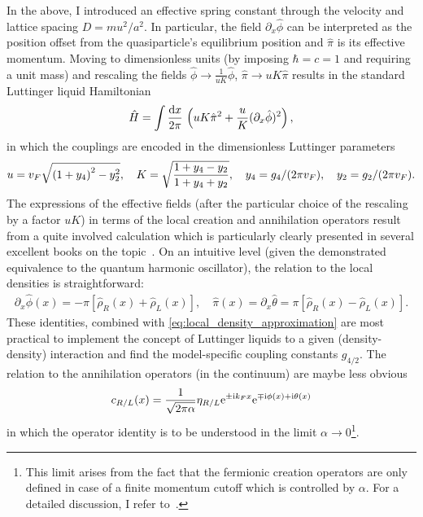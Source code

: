 In the above, I introduced an effective spring constant through the velocity and lattice spacing $D=mu^2/a^2$.
In particular, the field $\partial_x\hat\phi$ can be interpreted as the position offset from the quasiparticle's equilibrium position and $\hat\pi$ is its effective momentum.
Moving to dimensionless units (by imposing $\hbar=c=1$ and requiring a unit mass) and rescaling the fields $\hat\phi\rightarrow \frac1{uK}\hat\phi$, $\hat\pi\rightarrow uK\hat\pi$ results in the standard Luttinger liquid Hamiltonian
\begin{align}
    \hat H = \int\frac{\mathrm d x}{2\pi}\, \left( uK\hat\pi^2 + \frac uK(\partial_x\hat\phi)^2 \right),
    \label{eq:ll_hamiltonian}
\end{align}
in which the couplings are encoded in the dimensionless Luttinger parameters
\begin{align}
    u = v_F\sqrt{\left( 1 + y_4 \right)^2 - y_2^2},
    \quad
    K = \sqrt{\frac{1+y_4-y_2}{1+y_4+y_2}},
    \quad
    y_4=g_4/(2\pi v_F),
    \quad
    y_2=g_2/(2\pi v_F).
\end{align}
The expressions of the effective fields (after the particular choice of the rescaling by a factor $uK$) in terms of the local creation and annihilation operators result from a quite involved calculation which is particularly clearly presented in several excellent books on the topic~\cite{Bruus2004,Giamarchi2003,Gogolin2004}.
On an intuitive level (given the demonstrated equivalence to the quantum harmonic oscillator), the relation to the local densities is straightforward:
\begin{align}
    \partial_x\hat\phi(x)=-\pi[\hat\rho_R(x)+\hat\rho_L(x)],
    \quad
    \hat\pi(x)=\partial_x\hat\theta=\pi[\hat\rho_R(x)-\hat\rho_L(x)].
\end{align}
These identities, combined with \cref{eq:local_density_approximation} are most practical to implement the concept of Luttinger liquids to a given (density-density) interaction and find the model-specific coupling constants $g_{4/2}$.
The relation to the annihilation operators (in the continuum) are maybe less obvious
\begin{align}
    c_{R/L}(x) = \frac1{\sqrt{2\pi\alpha}}\eta_{R/L}\mathrm e^{\pm\mathrm i k_F x}\mathrm e^{\mp\mathrm i\phi(x) + \mathrm i\theta(x)}
    \label{eq:bosonization_identity}
\end{align}
in which the operator identity is to be understood in the limit $\alpha\rightarrow0$\footnote{This limit arises from the fact that the fermionic creation operators are only defined in case of a finite momentum cutoff which is controlled by $\alpha$. For a detailed discussion, I refer to~\cite{Bruus2004}.}.

